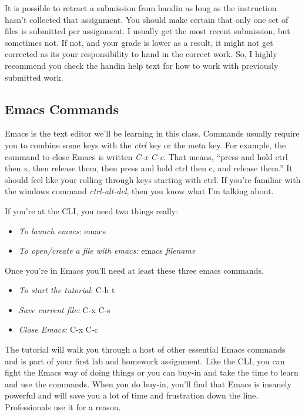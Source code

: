 \documentclass[nobib]{tufte-handout}
\begin{document}
It is possible to retract a submission from handin as long as the instruction hasn't collected that assignment. You should make certain that only one set of files is submitted per assignment. I usually get the most recent submission, but sometimes not. If not, and your grade is lower as a result, it might not get corrected as its your responsibility to hand in the correct work. So, I highly recommend you check the handin help text for how to work with previously submitted work.

\subsection{Emacs Commands}

Emacs is the text editor we'll be learning in this class. Commands usually require you to combine some keys with the \textit{ctrl} key or the meta key. For example, the command to close Emacs is written \textit{C-x C-c}. That means, ``press and hold ctrl then x, then release them, then press and hold ctrl then c, and release them.''  It should feel like your rolling through keys starting with ctrl.  If you're familiar with the windows command \textit{ctrl-alt-del}, then you know what I'm talking about.

If you're at the CLI, you need two things really:
\begin{itemize}
\item \textit{To launch emacs}: emacs
\item \textit{To open/create a file with emacs:} emacs \textit{filename}
\end{itemize}

Once you're in Emacs you'll need at least these three emacs commands.
\begin{itemize}
\item \textit{To start the tutorial}: C-h t
\item \textit{Save current file:} C-x C-s
\item \textit{Close Emacs:} C-x C-c
\end{itemize}

The tutorial will walk you through a host of other essential Emacs commands and is part of your first lab and homework assignment.  Like the CLI, you can fight the Emacs way of doing things or you can buy-in and take the time to learn and use the commands. When you do buy-in, you'll find that Emacs is insanely powerful and will save you a lot of time and frustration down the line. Professionals use it for a reason.
\end{document}
